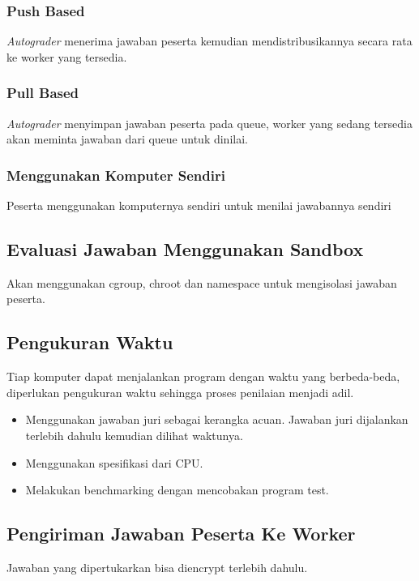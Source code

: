 \subsubsection{Push Based}

\par \textit{Autograder} menerima jawaban peserta kemudian mendistribusikannya secara rata ke worker yang tersedia.

\subsubsection{Pull Based}

\par \textit{Autograder} menyimpan jawaban peserta pada queue, worker yang sedang tersedia akan meminta jawaban dari queue untuk dinilai.

\subsubsection{Menggunakan Komputer Sendiri}

\par Peserta menggunakan komputernya sendiri untuk menilai jawabannya sendiri

\subsection{Evaluasi Jawaban Menggunakan Sandbox}

\par Akan menggunakan cgroup, chroot dan namespace untuk mengisolasi jawaban peserta.

\subsection{Pengukuran Waktu}

\par Tiap komputer dapat menjalankan program dengan waktu yang berbeda-beda, diperlukan pengukuran waktu sehingga proses penilaian menjadi adil.

\begin{itemize}
    \item Menggunakan jawaban juri sebagai kerangka acuan. Jawaban juri dijalankan terlebih dahulu kemudian dilihat waktunya.
    \item Menggunakan spesifikasi dari CPU.
    \item Melakukan benchmarking dengan mencobakan program test.
\end{itemize}

\subsection{Pengiriman Jawaban Peserta Ke Worker}

\par Jawaban yang dipertukarkan bisa diencrypt terlebih dahulu.
